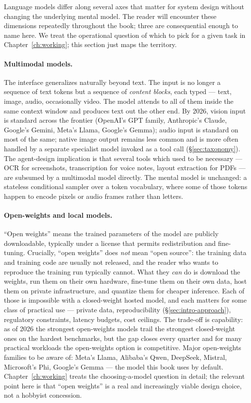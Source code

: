 Language models differ along several axes that matter for system
design without changing the underlying mental model. The reader
will encounter these dimensions repeatedly throughout the book;
three are consequential enough to name here. We treat the
operational question of which to pick for a given task in
Chapter~\ref{ch:working}; this section just maps the territory.

\paragraph{Multimodal models.}
The interface generalizes naturally beyond text. The input is no
longer a sequence of text tokens but a sequence of \emph{content
blocks}, each typed --- text, image, audio, occasionally video.
The model attends to all of them inside the same context window
and produces text out the other end. By 2026, vision input is
standard across the frontier (OpenAI's GPT family, Anthropic's
Claude, Google's Gemini, Meta's Llama, Google's Gemma); audio
input is standard on most of the same; native image output
remains less common and is more often handled by a separate
specialist model invoked as a tool call
(\S\ref{sec:taxonomy}). The agent-design implication is that
several tools which used to be necessary --- OCR for screenshots,
transcription for voice notes, layout extraction for PDFs --- are
subsumed by a multimodal model directly. The mental model is
unchanged: a stateless conditional sampler over a token
vocabulary, where some of those tokens happen to encode pixels or
audio frames rather than letters.

\paragraph{Open-weights and local models.}
``Open weights'' means the trained parameters of the model are
publicly downloadable, typically under a license that permits
redistribution and fine-tuning. Crucially, ``open weights'' does
\emph{not} mean ``open source'': the training data and training
code are usually not released, and the reader who wants to
reproduce the training run typically cannot. What they
\emph{can} do is download the weights, run them on their own
hardware, fine-tune them on their own data, host them on private
infrastructure, and quantize them for cheaper inference. Each of
those is impossible with a closed-weight hosted model, and each
matters for some class of practical use --- private data,
reproducibility (\S\ref{sec:intro-approach}), regulatory
constraints, latency budgets, cost ceilings. The trade-off is
capability: as of 2026 the strongest open-weights models trail
the strongest closed-weight ones on the hardest benchmarks, but
the gap closes every quarter and for many practical workloads
the open-weights option is competitive. Major open-weights
families to be aware of: Meta's Llama, Alibaba's Qwen, DeepSeek,
Mistral, Microsoft's Phi, Google's Gemma --- the model this book
uses by default. Chapter~\ref{ch:working} treats the choosing-a-model
question in detail; the relevant point here is that ``open
weights'' is a real and increasingly viable design choice, not a
hobbyist concession.

